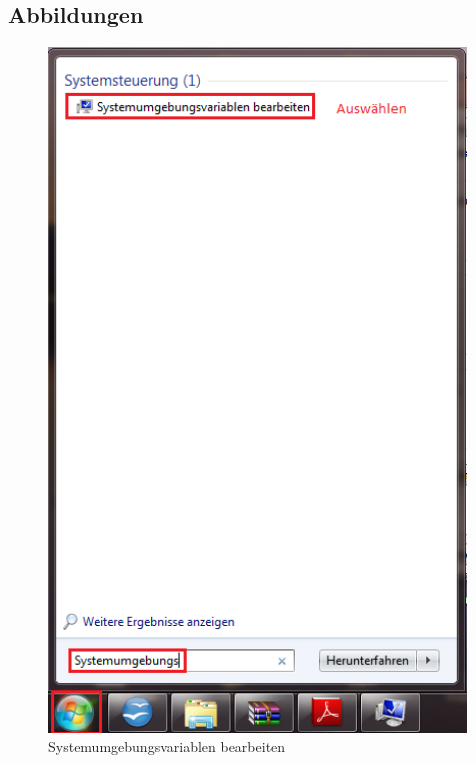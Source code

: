 \begin{appendix}

    \chapter{Abbildungen}

        \begin{figure}[ht]
            \centering
            \includegraphics[width=0.99\textwidth]{src/pictures/win-sysvar.png}
            \caption{Systemumgebungsvariablen bearbeiten}
            \label{img:win:sysvar1}
        \end{figure}


\end{appendix}
